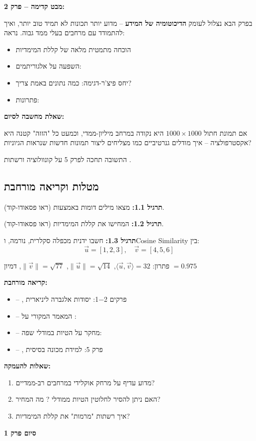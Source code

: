 \textbf{מבט קדימה – פרק \num{2}:}

בפרק הבא נצלול לעומק \textbf{הדיכוטומיה של המידע} – מדוע יותר תכונות לא תמיד טוב יותר, ואיך להתמודד עם מרחבים בעלי ממד גבוה. נראה:

\begin{itemize}
\item הוכחה מתמטית מלאה של קללת המימדיות
\item השפעה על אלגוריתמים: 
\item יחס פיצ'ר-דגימה: כמה נתונים באמת צריך?
\item פתרונות: 
\end{itemize}

\textbf{שאלת מחשבה לסיום:}

אם תמונת חתול $\num{1000} \times \num{1000}$ היא נקודה במרחב מיליון-ממדי, וכמעט כל "הזזה" קטנה היא אקסטרפולציה – איך מודלים גנרטיביים כמו  מצליחים ליצור תמונות חדשות שנראות הגיוניות?

התשובה תחכה לפרק \num{5} על קונוולוציה ורשתות .

\subsection*{מטלות וקריאה מורחבת}

\textbf{תרגיל \num{1.1}:} מצאו מילים דומות באמצעות  (ראו פסאודו-קוד).

\textbf{תרגיל \num{1.2}:} המחישו את קללת המימדיות (ראו פסאודו-קוד).

\textbf{תרגיל \num{1.3}:} חשבו ידנית מכפלה סקלרית, נורמה, ו\en{-}Cosine Similarity בין:
\[
\vec{u} = [\num{1}, \num{2}, \num{3}], \quad \vec{v} = [\num{4}, \num{5}, \num{6}]
\]

פתרון: $\langle \vec{u}, \vec{v} \rangle = \num{32}$, $\|\vec{u}\| = \sqrt{\num{14}}$, $\|\vec{v}\| = \sqrt{\num{77}}$, דמיון $= \num{0.975}$

\textbf{קריאה מורחבת:}

\begin{itemize}
\item \cite{strang2019} – , פרקים \num{1-2}: יסודות אלגברה ליניארית
\item \cite{mikolov2013} – המאמר המקורי על : 
\item \cite{caliskan2017} – מחקר על הטיות במודלי שפה: 
\item \cite{goodfellow2016} – , פרק \num{5}: למידת מכונה בסיסית
\end{itemize}

\textbf{שאלות להעמקה:}

\begin{enumerate}
\item מדוע  עדיף על מרחק אוקלידי במרחבים רב-ממדיים?
\item האם ניתן להסיר לחלוטין הטיות ממודלי ? מה המחיר?
\item איך רשתות  "מרמות" את קללת המימדיות?
\end{enumerate}

\textbf{סיום פרק \num{1}}